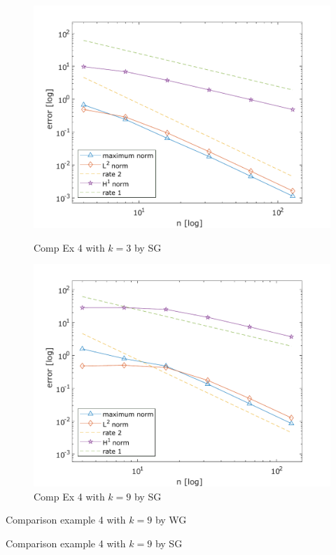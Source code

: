 	\begin{figure}[!htbp]
		\centering
		\begin{minipage}{.5\textwidth}
			\centering
			\includegraphics[width=1\linewidth]{svg/u3_k=3}
			\caption{Comp Ex 4 with $k=3$ by SG}
			\label{fig:u3_k=3}
		\end{minipage}%
		\begin{minipage}{.5\textwidth}
			\centering
			\includegraphics[width=1\linewidth]{svg/u3_k=9}
			\caption{Comp Ex 4 with $k=9$ by SG}
			\label{fig:u3_k=9}
		\end{minipage}
	\end{figure}

	\begin{table}[!htbp]		
	\begin{mdframed}[linecolor=red,linewidth=.5pt,roundcorner=10pt]
		\centering
		\caption{Comparison example 4 with $k=9$ by WG}\vspace{-5pt}
		
		\label{table:WG_u3_k=9_convergence_rates}
		\vspace{10pt}
		\caption{Comparison example 4 with $k=9$ by SG}\vspace{-5pt}
		
		\label{table:SG_u3_k=9_convergence_rates}
	\end{mdframed}		
	\end{table}\vspace{-5pt}
	
